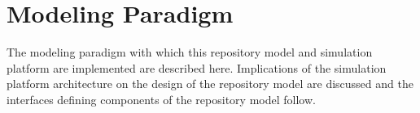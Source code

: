 \chapter{Modeling Paradigm}\label{ch:paradigm}

The modeling paradigm with which this repository model and simulation 
platform are implemented are described here. Implications of the 
simulation platform architecture on the design of the repository model 
are discussed and the interfaces defining components of the repository 
model follow. 






% 


